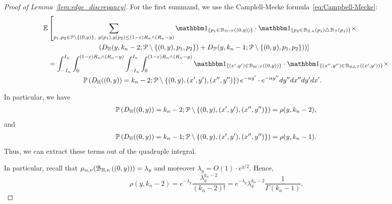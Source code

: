 \begin{proof}[Proof of Lemma~\ref{lem:edge_discrepancy}]
For the first summand, we use the Camplell-Mecke 
formula~\eqref{eq:Campbell-Mecke}: 
\begin{equation} \label{eq:1sum-expansion}
\begin{split} 
{\mathbb E}& \left[  \sum_{p_1, p_2\in \Pcal \setminus \{(0,y)\}, \ y(p_1), y(p_2) \leq (1-\eps) R_n\wedge (R_n-y)} \ind{p_1 \in \BallInter{(0,y)}} \cdot \ind{p_2 \in \BallHyp{p_1}\bigtriangleup \BallPo{p_1}} \times \right.\\ 
&\left. \hspace{2.5cm}\left(  D_\H (y,k_n-2;\Pcal \setminus \{ (0,y),p_1,p_2\}) 
+D_\Pcal (y,k_n-1;\Pcal \setminus \{ (0,y),p_1,p_2\})\right) \right] \\
&=\int_{-I_n}^{I_n} \int_0^{(1-\eps) R_n\wedge (R_n-y)}\int_{-I_n}^{I_n} \int_0^{(1-\eps) R_n\wedge (R_n-y)}
 \ind{(x',y') \in \BallInter{(0,y)}} \cdot 
 \ind{(x'',y'') \in \BallSym{(x',y')}}\times
 \\
 &\hspace{1.8cm} 
  \Prob{D_\H ((0,y))=k_n-2;\Pcal \setminus \{ (0,y),(x',y'), (x'',y'')\}}
  e^{-\alpha y'} \cdot e^{-\alpha y''} dy'' dx''dy' dx'.
\end{split}
\end{equation}

In particular, we have 
\begin{equation*}
\begin{split} 
\mathbb{P}\left(D_{\mathbb{H}} ((0,y))=k_n-2;{\mathcal P} \setminus \{ (0,y),(x',y'), (x'',y'')\}\right) =\rho(y,k_n-2),
\end{split}
\end{equation*}
and 
\begin{equation*}
\begin{split} 
\mathbb{P}\left(D_{\mathbb{H}} ((0,y))=k_n-1;{\mathcal P} \setminus \{ (0,y),(x',y'), (x'',y'')\}\right) =\rho(y,k_n-1).
\end{split}
\end{equation*}
Thus, we can extract these terms out of the quadruple integral. 

In particular, recall that $\mu_{\alpha,\nu} ({\mathcal B}_{\mathbb{H},n}\left((0,y)\right)) = \lambda_y$ and moreover 
$\lambda_y = O(1) \cdot e^{y/2}$. 
Hence, 
\begin{equation}\label{eq:prob_k_n-2}
\rho(y,k_n-2)= e^{-\lambda_y} \frac{\lambda_y^{k_n-2}}{(k_n-2)!}  
= e^{-\lambda_y} \lambda_y^{k_n-2} \frac{1}{\Gamma (k_n-1)}.  
\end{equation}




\end{proof}
